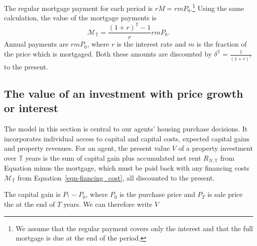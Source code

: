 The regular mortgage payment for each period is $rM=rmP_0$.\footnote{We assume that the regular payment covers only the interest and that the full mortgage is due at the end of the period.} Using the same calculation, the value of the mortgage payments is 
\begin{equation}\label{eqn-fiancing_cost}
\mathcal{M}_{\mathbb{T}} = \frac{(1+r)^\mathbb{T}-1}{r}rmP_0. 
\end{equation}
Annual payments are $rmP_0$, where  $r$ is the interest rate and $m$ is the fraction of the price which is mortgaged. Both these amounts are discounted by $\delta^\mathbb{T}=\frac{1}{(1+r)^\mathbb{T}}$ to the present. %
 
\subsection{The value of an investment with price growth or interest}
 The model in this section is central to our agents' housing purchase decisions. It incorporates individual access to capital and capital costs, expected capital gains and property revenues.  
 For an agent, the present value $V$ of a property investment over  $\mathbb{T}$ years is the sum of capital gain plus accumulated net rent ${R}_{N, \mathbb{T}}$ from Equation minus the mortgage, which must be paid back with any financing costs $\mathcal{M}_{\mathbb{T}}$ from Equation~\ref{eqn-fiancing_cost}, all discounted to the present. 
 
 The capital gain is  $P_{^\mathbb{T}}-P_{0}$, where $P_0$ is the purchase price and  $P_T$ is sale price the at the end of $T$ years. 
We can therefore write $V$ %
 
